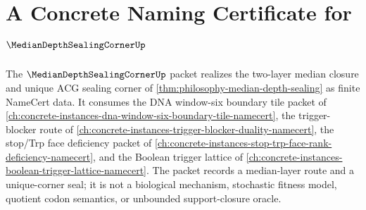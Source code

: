 \chapter{A Concrete Naming Certificate for $\MedianDepthSealingCornerUp$}
\label{ch:concrete-instances-median-depth-sealing-corner-namecert}

The $\MedianDepthSealingCornerUp$ packet realizes the two-layer median closure and unique $\mathrm{ACG}$ sealing corner of \autoref{thm:philosophy-median-depth-sealing} as finite NameCert data. It consumes the DNA window-six boundary tile packet of \autoref{ch:concrete-instances-dna-window-six-boundary-tile-namecert}, the trigger-blocker route of \autoref{ch:concrete-instances-trigger-blocker-duality-namecert}, the stop/Trp face deficiency packet of \autoref{ch:concrete-instances-stop-trp-face-rank-deficiency-namecert}, and the Boolean trigger lattice of \autoref{ch:concrete-instances-boolean-trigger-lattice-namecert}. The packet records a median-layer route and a unique-corner seal; it is not a biological mechanism, stochastic fitness model, quotient codon semantics, or unbounded support-closure oracle.

